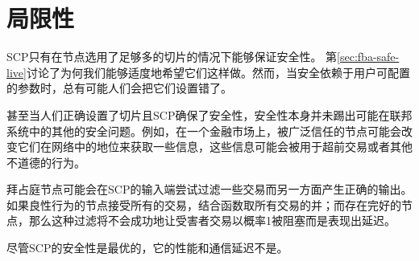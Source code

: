 \section{局限性}

SCP只有在节点选用了足够多的{\quorum}切片的情况下能够保证安全性。	第\ref{sec:fba-safe-live}讨论了为何我们能够适度地希望它们这样做。然而，当安全依赖于用户可配置的参数时，总有可能人们会把它们设置错了。

甚至当人们正确设置了{\quorum}切片且SCP确保了安全性，安全性本身并未踢出可能在联邦系统中的其他的安全问题。例如，在一个金融市场上，被广泛信任的节点可能会改变它们在网络中的地位来获取一些信息，这些信息可能会被用于超前交易或者其他不道德的行为。

拜占庭节点可能会在SCP的输入端尝试过滤一些交易而另一方面产生正确的输出。如果良性行为的节点接受所有的交易，结合函数取所有交易的并；而存在完好的节点，那么这种过滤将不会成功地让受害者交易以概率1被阻塞而是表现出延迟。

尽管SCP的安全性是最优的，它的性能和通信延迟不是。